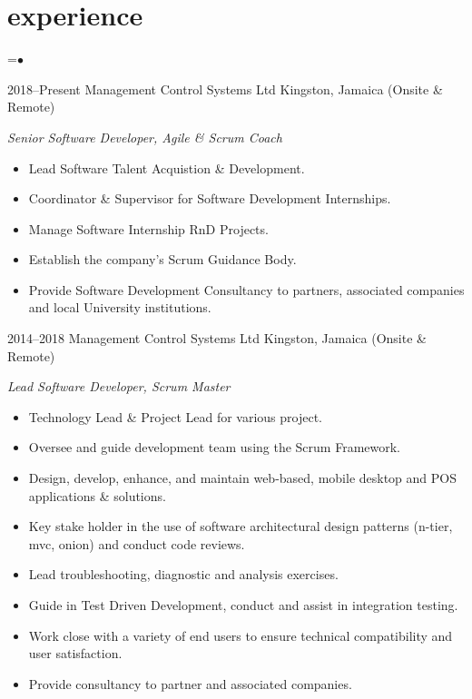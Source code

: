 \documentclass[]{friggeri-cvRS}
\begin{document}

\section{experience}

=\hbox{$\bullet$}
\begin{entrylist}
  \entry
    {2018--Present}
    {Management Control Systems Ltd}
    {Kingston, Jamaica (Onsite \& Remote)}
    {\emph{Senior Software Developer, Agile \& Scrum Coach}
    \begin{itemize}
	\item Lead Software Talent Acquistion \& Development.
	\item Coordinator \& Supervisor for Software Development Internships.
	\item Manage Software Internship RnD Projects. 
	\item Establish the company's Scrum Guidance Body. 
	\item Provide Software Development Consultancy to partners, associated companies and local University institutions. \\

    \end{itemize}}
  \entry
    {2014--2018}
    {Management Control Systems Ltd}
    {Kingston, Jamaica (Onsite \& Remote)}
    {\emph{Lead Software Developer, Scrum Master}
    \begin{itemize}
	\item Technology Lead \& Project Lead for various project.
	\item Oversee and guide development team using the Scrum Framework.
	\item Design, develop, enhance, and maintain web-based, mobile desktop and POS applications \& solutions.
	\item Key stake holder in the use of software architectural design patterns (n-tier, mvc, onion) and conduct code reviews.
	\item Lead troubleshooting, diagnostic and analysis exercises.
	\item Guide in Test Driven Development, conduct and assist in integration testing.
	\item Work close with a variety of end users to ensure technical compatibility and user satisfaction.
	\item Provide consultancy to partner and associated companies.\\


\end{itemize}}
\end{entrylist}
\end{document}
